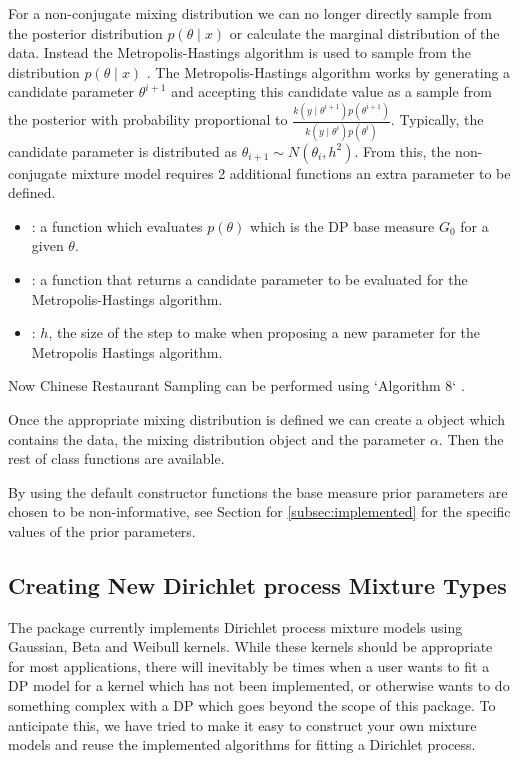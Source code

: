 \documentclass[nojss]{jss}
\begin{document}
For a non-conjugate mixing distribution we can no longer directly sample from the posterior distribution $p(\theta \mid x)$ or calculate the marginal distribution of the data. Instead the Metropolis-Hastings algorithm is used to sample from the distribution $p(\theta \mid x)$ \cite{hastings_monte_1970}. The Metropolis-Hastings algorithm works by generating a candidate parameter $\theta ^{i+1}$ and accepting this candidate value as a sample from the posterior with probability proportional to $\frac{k(y \mid \theta ^{i+1}) p(\theta ^{i+1})}{k(y \mid \theta^i) p(\theta^i)}$. Typically, the candidate parameter is distributed as $\theta _{i+1} \sim N(\theta _i, h^2)$. From this, the non-conjugate mixture model requires 2 additional functions an extra parameter to be defined.
\begin{itemize}
\item {}: a function which evaluates $p(\theta)$ which is the DP base measure $G_0$ for a given $\theta$.
\item {}: a function that returns a candidate parameter to be evaluated for the Metropolis-Hastings algorithm.
\item {}: $h$, the size of the step to make when proposing a new parameter for the Metropolis Hastings algorithm.
\end{itemize}
Now Chinese Restaurant Sampling can be performed using `Algorithm 8` \citep{neal_markov_2000}.

Once the appropriate mixing distribution is defined we can create a  object which contains the data, the mixing distribution object and the parameter $\alpha$. Then the rest of  class functions are available.

By using the default constructor functions  the base measure prior parameters are chosen to be non-informative, see Section for \ref{subsec:implemented} for the specific values of the prior parameters.

\subsection{Creating New Dirichlet process Mixture Types} \label{sec:NewMDobj}
The  package currently implements Dirichlet process mixture models using Gaussian, Beta and Weibull kernels. While these kernels should be appropriate for most applications, there will inevitably be times when a user wants to fit a DP model for a kernel which has not been implemented, or otherwise wants to do something complex with a DP which goes beyond the scope of this package. To anticipate this, we have tried to make it easy to construct your own mixture models and reuse the implemented algorithms for fitting a Dirichlet process.
\end{document}
